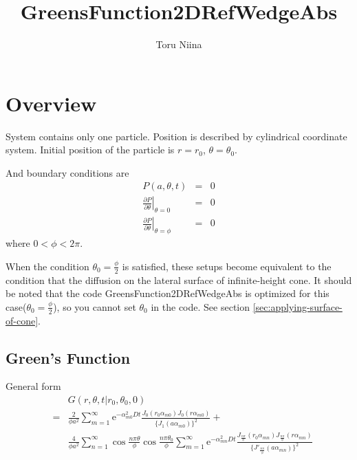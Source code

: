 \documentclass{article}
\begin{document}
\title{GreensFunction2DRefWedgeAbs}
\author{Toru Niina}
\maketitle

\section{Overview}

System contains only one particle. 
 Position is described by cylindrical coordinate system.
 Initial position of the particle is $r = r_0$, $\theta = \theta_0$.

And boundary conditions are
\begin{eqnarray}
    P(a, \theta, t) &=& 0 \nonumber \\
    \left.\frac{\partial P}{\partial\theta}\right|_{\theta = 0} &=& 0 \nonumber \\
    \left.\frac{\partial P}{\partial\theta}\right|_{\theta = \phi} &=& 0
    \label{boundary-conditions}
\end{eqnarray}
where $0 < \phi < 2\pi$.

When the condition $\theta_0 = \frac{\phi}{2}$ is satisfied, 
these setups become equivalent to the condition that
the diffusion on the lateral surface of infinite-height cone.
It should be noted that the code GreensFunction2DRefWedgeAbs
is optimized for this case($\theta_0 = \frac{\phi}{2}$), so
you cannot set $\theta_0$ in the code.
See section \ref{sec:applying-surface-of-cone}.

\subsection{Green's Function}
General form
\begin{eqnarray}
    & & G(r, \theta, t | r_0, \theta_0, 0) \nonumber \\
    &=& \frac{2}{\phi a^2} \sum^{\infty}_{m=1}
        \mathrm{e}^{-\alpha_{m0}^2Dt}
        \frac{J_0(r_0\alpha_{m0})
              J_0(r\alpha_{m0})}
             {\{J_1(a\alpha_{m0})\}^2}+\nonumber\\
    & & \frac{4}{\phi a^2}\sum^{\infty}_{n=1}
        \cos\frac{n\pi\theta}{\phi}\cos\frac{n\pi\theta_0}{\phi}
        \sum^{\infty}_{m=1}
        \mathrm{e}^{-\alpha_{mn}^2Dt}
        \frac{J_{\frac{n\pi}{\phi}}(r_0\alpha_{mn})
              J_{\frac{n\pi}{\phi}}(r\alpha_{mn})}
             {\{J'_{\frac{n\pi}{\phi}}(a\alpha_{mn})\}^2}
    \label{greens-function}
\end{eqnarray}
\end{document}
